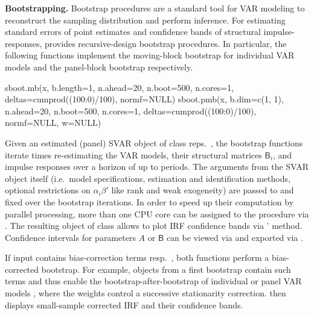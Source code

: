 \textbf{Bootstrapping.} Bootstrap procedures are a standard tool for VAR modeling to reconstruct the sampling distribution and perform inference. For estimating standard errors of point estimates and confidence bands of structural impulse-responses,  provides recursive-design bootstrap procedures. In particular, the following functions implement the moving-block bootstrap for individual VAR models \citep{BruggemannEtAl2016} and the panel-block bootstrap \citep{EmptingEtAl2024} respectively. 
\begin{CodeChunk}
\begin{CodeInput}
sboot.mb(x, b.length=1, n.ahead=20, n.boot=500, n.cores=1, 
	  deltas=cumprod((100:0)/100), normf=NULL)
sboot.pmb(x, b.dim=c(1, 1), n.ahead=20, n.boot=500, n.cores=1, 
	  deltas=cumprod((100:0)/100), normf=NULL, w=NULL)
\end{CodeInput}
\end{CodeChunk}
Given an estimated (panel) SVAR object  of class  reps.~, the bootstrap functions iterate  times re-estimating the VAR models, their structural matrices $ \mathsf{B}_i $, and impulse responses over a horizon of up to  periods. The arguments from the SVAR object itself (i.e.~model specifications, estimation and identification methods, optional restrictions on $ \alpha_i \beta' $ like rank and weak exogeneity) are passed to and fixed over the bootstrap iterations. In order to speed up their computation by parallel processing, more than one CPU core can be assigned to the procedure via . The resulting  object of class  allows to plot IRF confidence bands via '  method. Confidence intervals for parameters $ A $ or $ \mathsf{B} $ can be viewed via  and exported via .

If input  contains bias-correction terms  resp.~, both functions perform a bias-corrected bootstrap. For example, objects from a first bootstrap contain such terms and thus enable the bootstrap-after-bootstrap of individual \citep{Kilian1998} or panel VAR models \citep{EmptingEtAl2024}, where the weights  control a successive stationarity correction.  then displays small-sample corrected IRF and their confidence bands. 

